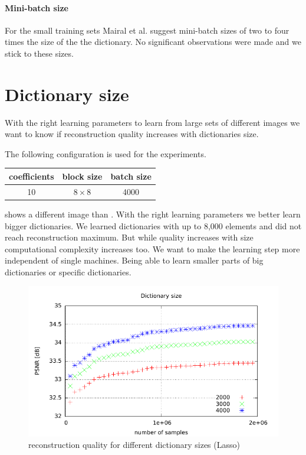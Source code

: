 
\paragraph{Mini-batch size}
For the small training sets Mairal et al. suggest mini-batch sizes of two to
four times the size of the the dictionary. No significant observations were made
and we stick to these sizes. 

\clearpage

\section{Dictionary size}
With the right learning parameters to learn from large sets of
different images we want to know if reconstruction quality increases with
dictionaries size.

The following configuration is used for the experiments. 
\begin{table}[H]
\centering
\begin{tabular}{| c | c | c |}
\hline
\hline
coefficients & block size & batch size \\
\hline
10 & $8\times 8$ & 4000  \\
\hline
\end{tabular}
\end{table}

 shows a different image than
. With the right learning parameters 
we better learn bigger dictionaries. We learned dictionaries with up to 8,000
elements and did not reach reconstruction maximum. But while quality increases
with size computational complexity increases too. We want to make the learning
step more independent of single machines. Being able to learn smaller parts of
big dictionaries or specific dictionaries.


\begin{figure}[h]
\centering
\includegraphics[width = 1.0\textwidth]{../tests/results/dictSizeLassoGod.pdf}
\caption{reconstruction quality for different dictionary sizes (Lasso)}
\label{fig:dictSizeGood}
\end{figure}

